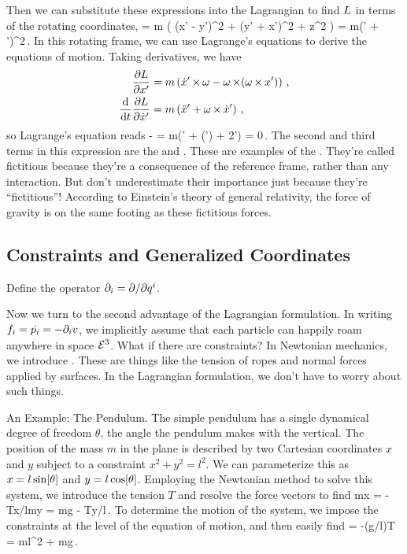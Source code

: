 Then we can substitute these expressions into the Lagrangian to find $L$ in terms of the rotating coordinates,
\beq
\lag = m \left( (\dt x' - \omega y')^2 + (\dt y' + \omega x')^2 + \dt z^2 \right)
     = m(\dt\pvec' + \omega\cprod\pvec')^2\,.
\eeq
In this rotating frame, we can use Lagrange's equations to derive the equations of motion. Taking derivatives, we have
\begin{align*}
\dfrac{\partial{L}}{\partial{x'}}             &= m\left(\dot{x}'\operatorname{\times}\omega - \omega\operatorname{\times}(\omega\operatorname{\times}x') \right) \,,\\
\dfrac{\text{d}{}}{\text{d}{t}}\dfrac{\partial{L}}{\partial{\dot{x}'}} &= m\left(\ddot{x}' + \omega\operatorname{\times}\dot{x}' \right)\,,
\end{align*}
so Lagrange's equation reads
\beq
{} -  
    = m\left(\ddt\pvec' 
      + \omega\cprod(\omega\cprod\pvec') 
      + 2\omega\cprod\dt\pvec'\right) = 0\,.
\eeq
The second and third terms in this expression are the  and . These are examples of the . They're called fictitious because they're a consequence of the reference frame, rather than any interaction. But don't underestimate their importance just because they're ``fictitious''! According to Einstein's theory of general relativity, the force of gravity is on the same footing as these fictitious forces.


\subsection{Constraints and Generalized Coordinates}
Define the operator $\partial_{i} = \partial/\partial{q}^{i}$.

Now we turn to the second advantage of the Lagrangian formulation. In writing ${f}_{i} = \dot{{p}_{i}} = -\partial_{i}v$, we implicitly assume that each particle can happily roam anywhere in space $\mathcal{E}^{3}$. What if there are constraints? In Newtonian mechanics, we introduce . These are things like the tension of ropes and normal forces applied by surfaces. In the Lagrangian formulation, we don't have to worry about such things. 

An Example: The Pendulum. The simple pendulum has a single dynamical degree of freedom $\theta$, the angle the pendulum makes with the vertical. The position of the mass $m$ in the plane is described by two Cartesian coordinates $x$ and $y$ subject to a constraint $x^2 + y^2 = l^2$. We can parameterize this as $x = l\sin\!\left[{\theta}\right]$ and $y = l\cos\!\left[{\theta}\right]$. Employing the Newtonian method to solve this system, we introduce the tension $T$ and resolve the force vectors to find
\beq
m\ddt x = -Tx/l\qquad{}\qquad m\ddt y = mg - Ty/l\,.
\eeq
To determine the motion of the system, we impose the constraints at the level of the equation of motion, and then easily find
\beq
\ddt\theta = -(g/l)\sin\vat\theta\qquad{}\qquad T = ml\dt\theta^2 + mg\cos\vat\theta\,.
\eeq

